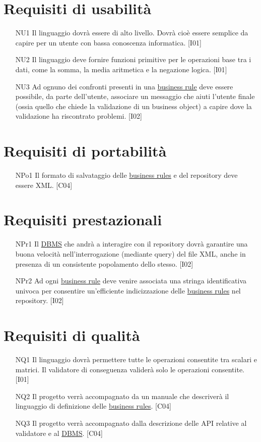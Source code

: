 \section{Requisiti di usabilit\`a}
\begin{itemize}
\item[NU1]{Il linguaggio dovr\`a essere di alto livello. Dovr\`a cio\`e essere semplice da capire per un utente con bassa conoscenza informatica. [I01]}
\item[NU2]{Il linguaggio deve fornire funzioni primitive per le operazioni base tra i dati, come la somma, la media aritmetica e la negazione logica. [I01]}
\item[NU3]{Ad ognuno dei confronti presenti in una \underline{business rule} deve essere possibile, da parte dell'utente, associare un messaggio che aiuti l'utente finale (ossia quello che chiede la validazione di un business object) a capire dove la validazione ha riscontrato problemi. [I02]}
\end{itemize}

\section{Requisiti di portabilit\`a}
\begin{itemize}
\item[NPo1]{Il formato di salvataggio delle \underline{business rules} e del repository deve essere XML. [C04]}
\end{itemize}
\section{Requisiti prestazionali}
\begin{itemize}
 \item[NPr1]{Il \underline{DBMS} che andr\`a a interagire con il repository dovr\`a garantire una buona velocit\`a nell'interrogazione (mediante query) del file XML, anche in presenza di un consistente popolamento dello stesso. [I02]}
\item[NPr2]{Ad ogni \underline{business rule} deve venire associata una stringa identificativa univoca per consentire un'efficiente indicizzazione delle \underline{business rules} nel repository. [I02]}
\end{itemize}

\section{Requisiti di qualit\`a}
\begin{itemize}
\item[NQ1]{Il linguaggio dovr\`a permettere tutte le operazioni consentite tra scalari e matrici. Il validatore di conseguenza valider\`a solo le operazioni consentite. [I01]}
\item[NQ2]{Il progetto verr\`a accompagnato da un manuale che descriver\`a il linguaggio di definizione delle \underline{business rules}. [C04]}
\item[NQ3]{Il progetto verr\`a accompagnato dalla descrizione delle API relative al validatore e al \underline{DBMS}. [C04]}
\end{itemize}
\newpage


